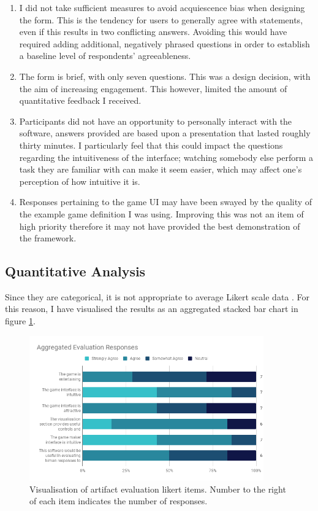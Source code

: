 \begin{enumerate}[label=\textbf{sc.\arabic*}]
    \item\label{sc:acq} I did not take sufficient measures to avoid acquiescence bias\cite{Acquiescence} when designing the form. This is the tendency for users to generally agree with statements, even if this results in two conflicting answers. Avoiding this would have required adding additional, negatively phrased questions in order to establish a baseline level of respondents' agreeableness.
    \item\label{sc:brief} The form is brief, with only seven questions. This was a design decision, with the aim of increasing engagement. This however, limited the amount of quantitative feedback I received.
    \item\label{sc:int} Participants did not have an opportunity to personally interact with the software, answers provided are based upon a presentation that lasted roughly thirty minutes. I particularly feel that this could impact the questions regarding the intuitiveness of the interface; watching somebody else perform a task they are familiar with can make it seem easier, which may affect one's perception of how intuitive it is.
    \item\label{sc:ex} Responses pertaining to the game UI may have been swayed by the quality of the example game definition I was using. Improving this was not an item of high priority therefore it may not have provided the best demonstration of the framework.
\end{enumerate}
\subsection{Quantitative Analysis}

Since they are categorical, it is not appropriate to average Likert scale data \cite{LikertAv}. For this reason, I have visualised the results as an aggregated stacked bar chart in figure \ref{fig:eval_responses}.

\begin{figure}[!h]
    \centering
    \includegraphics[width=0.9\textwidth]{./images/eval/Aggregated_Evaluation_Responses.png}
    \caption{Visualisation of artifact evaluation likert items. Number to the right of each item indicates the number of responses.}
    \label{fig:eval_responses}
\end{figure}

